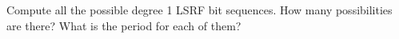   Compute all the possible degree 1 LSRF bit sequences.
  How many possibilities are there?
  What is the period for each of them?
